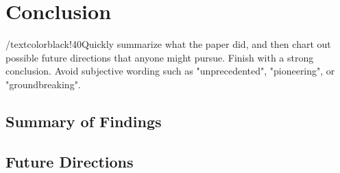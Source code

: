 
\section{Conclusion}\label{sec:Conclusion}
/textcolor{black!40}{Quickly summarize what the paper did, and then chart out possible future directions that anyone might pursue. Finish with a strong conclusion. Avoid subjective wording such as "unprecedented", "pioneering", or "groundbreaking".}
\subsection{Summary of Findings}
\textcolor{black!30}{\lipsum[63-64]}

\subsection{Future Directions}
\textcolor{black!30}{\lipsum[65]}


